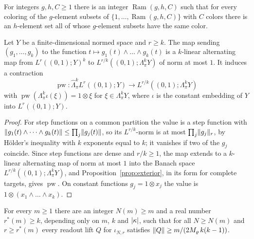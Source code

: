 \begin{lemma}\label{rig:lem:ramsey}
For integers $g,h,C\ge1$ there is an integer $\operatorname{Ram}(g,h,C)$ such that for every coloring of the
$g$\nobreakdash-element subsets of $\{1,\dots,\operatorname{Ram}(g,h,C)\}$ with $C$ colors there is an
$h$\nobreakdash-element set all of whose $g$\nobreakdash-element subsets have the same color.
\end{lemma}

\begin{lemma}\label{rig:lem:wedge-readout}
Let $Y$ be a finite-dimensional normed space and $r\ge k$. The map sending $(g_1,\dots,g_k)$ to the function
$t\mapsto g_1(t)\wedge\dots\wedge g_k(t)$ is a $k$\nobreakdash-linear alternating map from $L^r((0,1);Y)^k$ to
$L^{r/k}((0,1);\Lambda^k_\pi Y)$ of norm at most $1$. It induces a contraction
\[
 \operatorname{pw}\colon\widehat\Lambda^k_\pi L^r((0,1);Y)\to L^{r/k}((0,1);\Lambda^k_\pi Y)
\]
with $\operatorname{pw}(\Lambda^k_\pi\iota(\xi))=1\otimes\xi$ for $\xi\in\Lambda^k_\pi Y$, where $\iota$ is the constant
embedding of $Y$ into $L^r((0,1);Y)$.
\end{lemma}

\begin{proof}
For step functions on a common partition the value is a step function with
$\lVert g_1(t)\wedge\dots\wedge g_k(t)\rVert\le\prod_j\lVert g_j(t)\rVert$, so its $L^{r/k}$\nobreakdash-norm is at most
$\prod_j\lVert g_j\rVert_r$, by H\"older's inequality with $k$ exponents equal to $k$; it vanishes if two of the $g_j$
coincide. Since step functions are dense and $r/k\ge1$, the map extends to a $k$\nobreakdash-linear alternating map of
norm at most $1$ into the Banach space $L^{r/k}((0,1);\Lambda^k_\pi Y)$, and Proposition~\ref{prop:exterior}, in its
form for complete targets, gives $\operatorname{pw}$. On constant functions $g_j=1\otimes x_j$ the value is
$1\otimes(x_1\wedge\dots\wedge x_k)$.
\end{proof}

\begin{lemma}\label{rig:lem:test}
For every $m\ge1$ there are an integer $N(m)\ge m$ and a real number $r^*(m)\ge k$, depending only on $m$, $k$ and
$\lvert \kappa\rvert$, such that for all $N\ge N(m)$ and $r\ge r^*(m)$ every readout lift $Q$ for $\iota_{N,r}$ satisfies
$\lVert Q\rVert\ge m/(2M_\varrho\,k(k-1))$.
\end{lemma}

